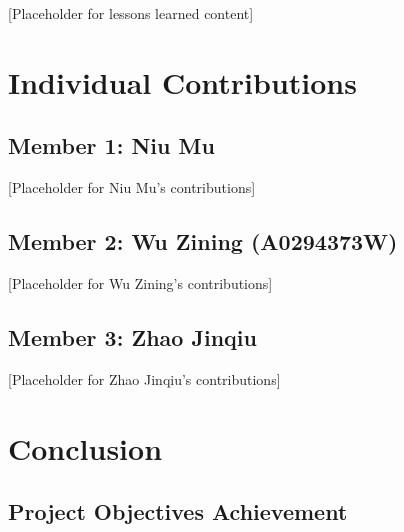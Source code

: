 \documentclass[12pt,a4paper]{article}
\begin{document}

[Placeholder for lessons learned content]

\section{Individual Contributions}


\subsection{Member 1: Niu Mu}


[Placeholder for Niu Mu's contributions]

\subsection{Member 2: Wu Zining (A0294373W)}


[Placeholder for Wu Zining's contributions]

\subsection{Member 3: Zhao Jinqiu}


[Placeholder for Zhao Jinqiu's contributions]

\section{Conclusion}


\subsection{Project Objectives Achievement}
\end{document}

